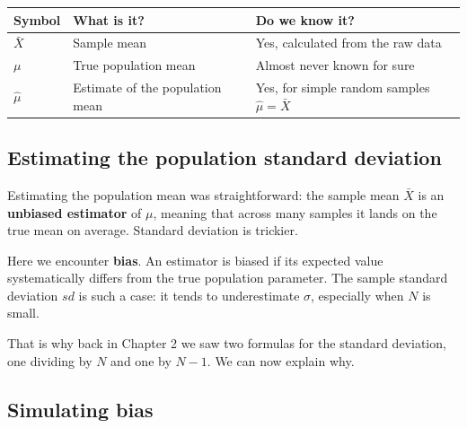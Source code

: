 \documentclass[
  letterpaper,
  DIV=11,
  numbers=noendperiod]{scrreprt}
\begin{document}
\begin{longtable}[]{@{}
  >{\raggedright\arraybackslash}p{}
  >{\raggedright\arraybackslash}p{}
  >{\raggedright\arraybackslash}p{}@{}}
\toprule\noalign{}
\begin{minipage}[b]{\linewidth}\raggedright
Symbol
\end{minipage} & \begin{minipage}[b]{\linewidth}\raggedright
What is it?
\end{minipage} & \begin{minipage}[b]{\linewidth}\raggedright
Do we know it?
\end{minipage} \\
\midrule\noalign{}
\endhead
\bottomrule\noalign{}
\endlastfoot
\(\bar{X}\) & Sample mean & Yes, calculated from the raw data \\
\(\mu\) & True population mean & Almost never known for sure \\
\(\hat{\mu}\) & Estimate of the population mean & Yes, for simple random
samples \(\hat\mu=\bar X\) \\
\end{longtable}

\subsection{Estimating the population standard
deviation}\label{estimating-the-population-standard-deviation}

Estimating the population mean was straightforward: the sample mean
\(\bar X\) is an \textbf{unbiased estimator} of \(\mu\), meaning that
across many samples it lands on the true mean on average. Standard
deviation is trickier.

Here we encounter \textbf{bias}. An estimator is biased if its expected
value systematically differs from the true population parameter. The
sample standard deviation \(sd\) is such a case: it tends to
underestimate \(\sigma\), especially when \(N\) is small.

That is why back in Chapter 2 we saw two formulas for the standard
deviation, one dividing by \(N\) and one by \(N-1\). We can now explain
why.

\subsection{Simulating bias}\label{simulating-bias}
\end{document}
